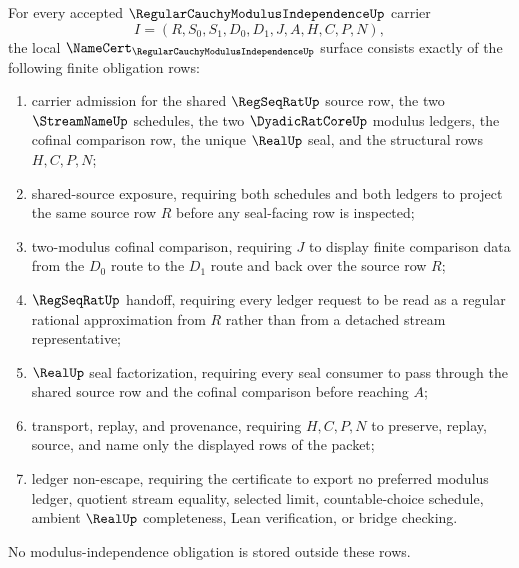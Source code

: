 \begin{theorem}
\label{thm:regular-cauchy-modulus-independence-namecert-obligations}
For every accepted $\RegularCauchyModulusIndependenceUp$ carrier
$$
I=(R,S_0,S_1,D_0,D_1,J,A,H,C,P,N),
$$
the local $\NameCert_{\RegularCauchyModulusIndependenceUp}$ surface consists exactly of the following finite obligation rows:
\begin{enumerate}
\item carrier admission for the shared $\RegSeqRatUp$ source row, the two $\StreamNameUp$ schedules, the two $\DyadicRatCoreUp$ modulus ledgers, the cofinal comparison row, the unique $\RealUp$ seal, and the structural rows $H,C,P,N$;
\item shared-source exposure, requiring both schedules and both ledgers to project the same source row $R$ before any seal-facing row is inspected;
\item two-modulus cofinal comparison, requiring $J$ to display finite comparison data from the $D_0$ route to the $D_1$ route and back over the source row $R$;
\item $\RegSeqRatUp$ handoff, requiring every ledger request to be read as a regular rational approximation from $R$ rather than from a detached stream representative;
\item $\RealUp$ seal factorization, requiring every seal consumer to pass through the shared source row and the cofinal comparison before reaching $A$;
\item transport, replay, and provenance, requiring $H,C,P,N$ to preserve, replay, source, and name only the displayed rows of the packet;
\item ledger non-escape, requiring the certificate to export no preferred modulus ledger, quotient stream equality, selected limit, countable-choice schedule, ambient $\RealUp$ completeness, Lean verification, or bridge checking.
\end{enumerate}
No modulus-independence obligation is stored outside these rows.
\end{theorem}
